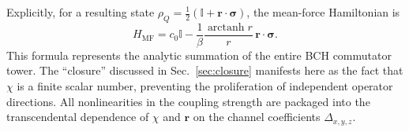 Explicitly, for a resulting state $\rho_Q = \frac{1}{2}(\mathbb{I} + \mathbf{r}\cdot\boldsymbol{\sigma})$, the mean-force Hamiltonian is
\begin{equation}
    H_{\mathrm{MF}} = c_0\mathbb{I} - \frac{1}{\beta}\frac{\operatorname{arctanh}r}{r}\,\mathbf{r}\cdot\boldsymbol{\sigma}.
    \label{eq:HMF_final_clean}
\end{equation}
This formula represents the analytic summation of the entire BCH commutator tower. The ``closure'' discussed in Sec.~\ref{sec:closure} manifests here as the fact that $\chi$ is a finite scalar number, preventing the proliferation of independent operator directions. All nonlinearities in the coupling strength are packaged into the transcendental dependence of $\chi$ and $\mathbf{r}$ on the channel coefficients $\Delta_{x,y,z}$.

